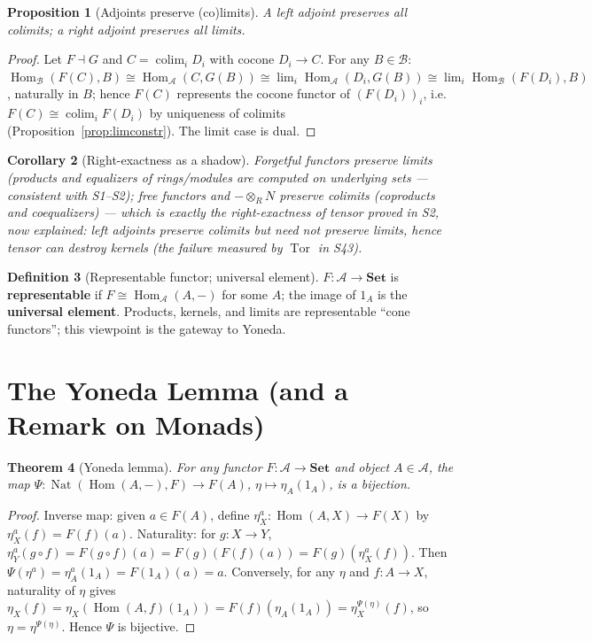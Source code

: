 \documentclass[11pt,a4paper]{article}
\newtheorem{theorem}{Theorem}[section]
\newtheorem{proposition}[theorem]{Proposition}
\newtheorem{corollary}[theorem]{Corollary}
\theoremstyle{definition}
\newtheorem{definition}[theorem]{Definition}
\newcommand{\Hom}{\operatorname{Hom}}
\newcommand{\Nat}{\operatorname{Nat}}
\newcommand{\colim}{\operatorname{colim}}
\newcommand{\Set}{\mathbf{Set}}
\newcommand{\Tor}{\operatorname{Tor}}
\begin{document}
\begin{proposition}[Adjoints preserve (co)limits]\label{prop:adj-preserve}
A left adjoint preserves all colimits; a right adjoint preserves all limits.
\end{proposition}
\begin{proof}
Let $F\dashv G$ and $C=\colim_i D_i$ with cocone $D_i\to C$. For any $B\in\mathcal B$:
$\Hom_{\mathcal B}(F(C),B)\cong\Hom_{\mathcal A}(C,G(B))\cong\lim_i\Hom_{\mathcal A}(D_i,G(B))
\cong\lim_i\Hom_{\mathcal B}(F(D_i),B)$, naturally in $B$; hence $F(C)$ represents the cocone functor
of $(F(D_i))_i$, i.e.\ $F(C)\cong\colim_i F(D_i)$ by uniqueness of colimits
(Proposition~\ref{prop:limconstr}). The limit case is dual.
\end{proof}

\begin{corollary}[Right-exactness as a shadow]\label{cor:adj-exact}
Forgetful functors preserve limits (products and equalizers of rings/modules are computed on
underlying sets --- consistent with S1--S2); free functors and $-\otimes_R N$ preserve colimits
(coproducts and coequalizers) --- which is exactly the right-exactness of tensor proved in S2,
now explained: left adjoints preserve colimits but need not preserve limits, hence tensor can
destroy kernels (the failure measured by $\Tor$ in S43).
\end{corollary}

\begin{definition}[Representable functor; universal element]
$F:\mathcal A\to\Set$ is \textbf{representable} if $F\cong\Hom_{\mathcal A}(A,-)$ for some $A$; the
image of $1_A$ is the \textbf{universal element}. Products, kernels, and limits are representable
``cone functors''; this viewpoint is the gateway to Yoneda.
\end{definition}

\section{The Yoneda Lemma (and a Remark on Monads)}

\begin{theorem}[Yoneda lemma]\label{thm:yoneda}
For any functor $F:\mathcal A\to\Set$ and object $A\in\mathcal A$, the map
$\Psi:\Nat(\Hom(A,-),F)\to F(A)$, $\eta\mapsto\eta_A(1_A)$, is a bijection.
\end{theorem}
\begin{proof}
Inverse map: given $a\in F(A)$, define $\eta^a_X:\Hom(A,X)\to F(X)$ by $\eta^a_X(f)=F(f)(a)$.
Naturality: for $g:X\to Y$, $\eta^a_Y(g\circ f)=F(g\circ f)(a)=F(g)(F(f)(a))=F(g)(\eta^a_X(f))$.
Then $\Psi(\eta^a)=\eta^a_A(1_A)=F(1_A)(a)=a$. Conversely, for any $\eta$ and $f:A\to X$,
naturality of $\eta$ gives $\eta_X(f)=\eta_X(\Hom(A,f)(1_A))=F(f)(\eta_A(1_A))=\eta^{\Psi(\eta)}_X(f)$,
so $\eta=\eta^{\Psi(\eta)}$. Hence $\Psi$ is bijective.
\end{proof}
\end{document}
